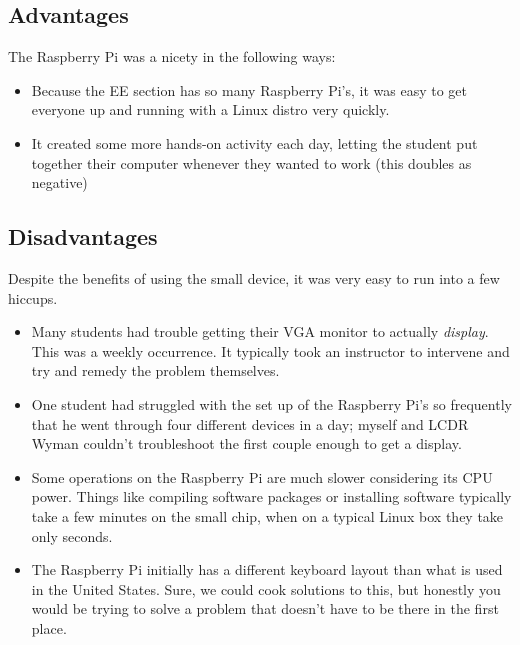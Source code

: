 \documentclass[11pt]{article}
\begin{document}
	\subsection{Advantages}

	The Raspberry Pi was a nicety in the following ways:

	\begin{itemize}
		\item Because the EE section has so many Raspberry Pi's, it was easy to get everyone up and running with a Linux distro very quickly.
		
		\item It created some more hands-on activity each day, letting the student put together their computer whenever they wanted to work (this doubles as negative)
	\end{itemize}

	\subsection{Disadvantages}

	Despite the benefits of using the small device, it was very easy to run into a few hiccups.

	\begin{itemize}
		\item Many students had trouble getting their VGA monitor to actually \textit{display}. This was a weekly occurrence. It typically took an instructor to intervene and try and remedy the problem themselves. 

		\item One student had struggled with the set up of the Raspberry Pi's so frequently that he went through four different devices in a day; myself and LCDR Wyman couldn't troubleshoot the first couple enough to get a display.
		
		\item Some operations on the Raspberry Pi are much slower considering its CPU power. Things like compiling software packages or installing software typically take a few minutes on the small chip, when on a typical Linux box they take only seconds.
		
		\item The Raspberry Pi initially has a different keyboard layout than what is used in the United States. Sure, we could cook solutions to this, but honestly you would be trying to solve a problem that doesn't have to be there in the first place.
	\end{itemize}
\end{document}
